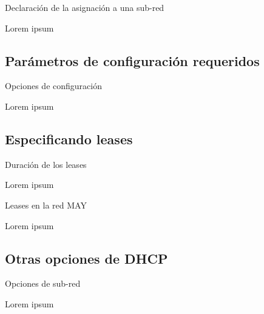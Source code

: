 \begin{frame}{Declaración de la asignación a una
sub-red}
    
   Lorem ipsum 
    
\end{frame}

\subsection{Parámetros de configuración requeridos} %


\begin{frame}{Opciones de configuración}

    Lorem ipsum
    
\end{frame}

\subsection{Especificando leases} %
\label{sub:Especificando leases}


\begin{frame}{Duración de los leases}

    Lorem ipsum
    
\end{frame}

\begin{frame}{Leases en la red MAY}

    Lorem ipsum
    
\end{frame}

\subsection{Otras opciones de DHCP} %
\label{sub:Otras opciones de DHCP}


\begin{frame}{Opciones de sub-red}

    Lorem ipsum
    
\end{frame}


